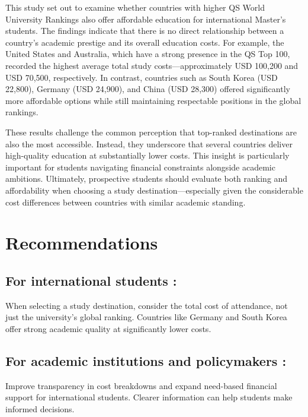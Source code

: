 \documentclass[
  letterpaper,
  DIV=11,
  numbers=noendperiod]{scrartcl}
\begin{document}
This study set out to examine whether countries with higher QS World
University Rankings also offer affordable education for international
Master's students. The findings indicate that there is no direct
relationship between a country's academic prestige and its overall
education costs. For example, the United States and Australia, which
have a strong presence in the QS Top 100, recorded the highest average
total study costs---approximately USD 100,200 and USD 70,500,
respectively. In contrast, countries such as South Korea (USD 22,800),
Germany (USD 24,900), and China (USD 28,300) offered significantly more
affordable options while still maintaining respectable positions in the
global rankings.

These results challenge the common perception that top-ranked
destinations are also the most accessible. Instead, they underscore that
several countries deliver high-quality education at substantially lower
costs. This insight is particularly important for students navigating
financial constraints alongside academic ambitions. Ultimately,
prospective students should evaluate both ranking and affordability when
choosing a study destination---especially given the considerable cost
differences between countries with similar academic standing.

\section{Recommendations}\label{recommendations}

\subsection{For international students
:}\label{for-international-students}

When selecting a study destination, consider the total cost of
attendance, not just the university's global ranking. Countries like
Germany and South Korea offer strong academic quality at significantly
lower costs.

\subsection{⁠For academic institutions and policymakers
:}\label{for-academic-institutions-and-policymakers}

Improve transparency in cost breakdowns and expand need-based financial
support for international students. Clearer information can help
students make informed decisions.
\end{document}

